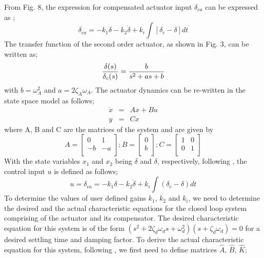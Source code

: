 \documentclass[conference]{IEEEtran}
\begin{document}
From Fig. 8, the expression for compensated actuator input $\delta_{ca}$ can be expressed as ;
%
\begin{equation}
\delta_{ca}=-k_1\delta-k_2\dot{\delta}+k_i\int[\delta_c-\delta]dt
\label{eq21}
\end{equation}
%
The transfer function of the second order actuator, as shown in Fig. 3, can be written as;
%
\begin{equation}
{{\delta (s)}\over{\delta_c(s)}} = {{b}\over{s^2 + as + b}}
\label{eq22}
\end{equation}
%
with $b=\omega_A^2$ and $a=2\zeta_A\omega_A$. The actuator dynamics can be re-written in the state space model as follows;
%
\begin{eqnarray}
\dot{x} &=& Ax+Bu \nonumber \\
y &=& Cx
\label{eq23}
\end{eqnarray}
%
where A, B and C are the matrices of the system and are given by
$$
A=\left[
\begin{array}{cccc}
0 & 1\\
-b & -a\\
\end{array}\right]; 
B=\left[
\begin{array}{cccc}
0 \\
b\\
\end{array}\right]; 
C=\left[
\begin{array}{cccc}
1 & 0\\
0 & 1\\
\end{array}\right]
$$
%
With the state variables $x_1$ and $x_2$ being $\delta$ and $\dot{\delta}$, respectively, following \cite{ogata2010}, the control input $u$ is defined as follows;
%
\begin{equation}
u= \delta_{ca}= -k_1\delta -k_2\dot{\delta} +k_i \int{(\delta_c-\delta)}dt
\label{eq24}
\end{equation}
%
%
%
To determine the values of user defined gains $k_1$, $k_2$ and $k_i$, we need to determine the desired and the actual characteristic equations for the closed loop system comprising of the actuator and its compensator. The desired characteristic equation for this system is of the form $(s^2+ 2\zeta_d\omega_ds+ \omega_d^2)(s+ \zeta_d\omega_d)=0$ for a desired settling time and damping factor. To derive the actual characteristic equation for this system, following \cite{ogata2010}, we first need to define matrices $\hat A$, $\hat B$, $\hat K$;
\end{document}
